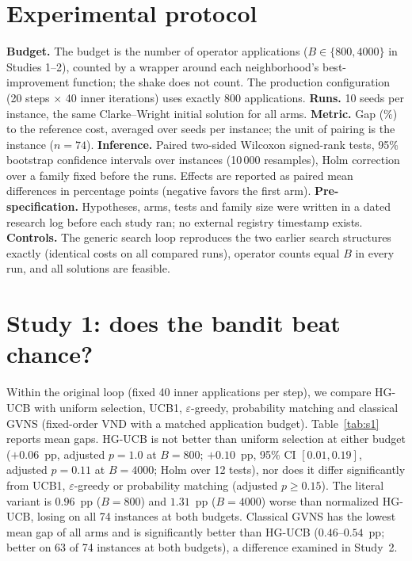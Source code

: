 \documentclass[conference]{IEEEtran}
\begin{document}
\section{Experimental protocol}\label{sec:protocol}
\textbf{Budget.} The budget is the number of operator applications ($B\in\{800,4000\}$ in Studies 1--2), counted by a wrapper around each neighborhood's best-improvement function; the shake does not count. The production configuration (20 steps $\times$ 40 inner iterations) uses exactly 800 applications. \textbf{Runs.} 10 seeds per instance, the same Clarke--Wright initial solution for all arms. \textbf{Metric.} Gap (\%) to the reference cost, averaged over seeds per instance; the unit of pairing is the instance ($n=74$). \textbf{Inference.} Paired two-sided Wilcoxon signed-rank tests, 95\% bootstrap confidence intervals over instances (10\,000 resamples), Holm correction over a family fixed before the runs. Effects are reported as paired mean differences in percentage points (negative favors the first arm). \textbf{Pre-specification.} Hypotheses, arms, tests and family size were written in a dated research log before each study ran; no external registry timestamp exists. %
\textbf{Controls.} The generic search loop reproduces the two earlier search structures exactly (identical costs on all compared runs), operator counts equal $B$ in every run, and all solutions are feasible.

\section{Study 1: does the bandit beat chance?}
Within the original loop (fixed 40 inner applications per step), we compare HG-UCB with uniform selection, UCB1, $\varepsilon$-greedy, probability matching and classical GVNS (fixed-order VND with a matched application budget). Table~\ref{tab:s1} reports mean gaps. HG-UCB is not better than uniform selection at either budget ($+0.06$~pp, adjusted $p=1.0$ at $B=800$; $+0.10$~pp, 95\% CI $[0.01,0.19]$, adjusted $p=0.11$ at $B=4000$; Holm over 12 tests), nor does it differ significantly from UCB1, $\varepsilon$-greedy or probability matching (adjusted $p\ge 0.15$). The literal variant is $0.96$~pp ($B=800$) and $1.31$~pp ($B=4000$) worse than normalized HG-UCB, losing on all 74 instances at both budgets. Classical GVNS has the lowest mean gap of all arms and is significantly better than HG-UCB ($0.46$--$0.54$~pp; better on 63 of 74 instances at both budgets), a difference examined in Study~2.
\end{document}
